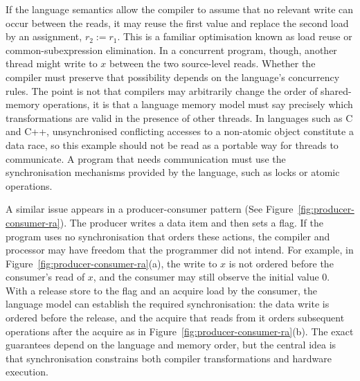 If the language semantics allow the compiler to assume that no relevant write can occur between the reads, it may reuse the first value and replace the second load by an assignment, $r_2 := r_1$. This is a familiar optimisation known as load reuse or common-subexpression elimination. In a concurrent program, though, another thread might write to $x$ between the two source-level reads. Whether the compiler must preserve that possibility depends on the language's concurrency rules. The point is not that compilers may arbitrarily change the order of shared-memory operations, it is that a language memory model must say precisely which transformations are valid in the presence of other threads. In languages such as C and C++, unsynchronised conflicting accesses to a non-atomic object constitute a data race, so this example should not be read as a portable way for threads to communicate. A program that needs communication must use the synchronisation mechanisms provided by the language, such as locks or atomic operations.

A similar issue appears in a producer-consumer pattern (See Figure~\ref{fig:producer-consumer-ra}). The producer writes a data item and then sets a flag. If the program uses no synchronisation that orders these actions, the compiler and processor may have freedom that the programmer did not intend. For example, in Figure~\ref{fig:producer-consumer-ra}(a), the write to $x$ is not ordered before the consumer's read of $x$, and the consumer may still observe the initial value $0$. With a release store to the flag and an acquire load by the consumer, the language model can establish the required synchronisation: the data write is ordered before the release, and the acquire that reads from it orders subsequent operations after the acquire as in Figure~\ref{fig:producer-consumer-ra}(b). The exact guarantees depend on the language and memory order, but the central idea is that synchronisation constrains both compiler transformations and hardware execution.

